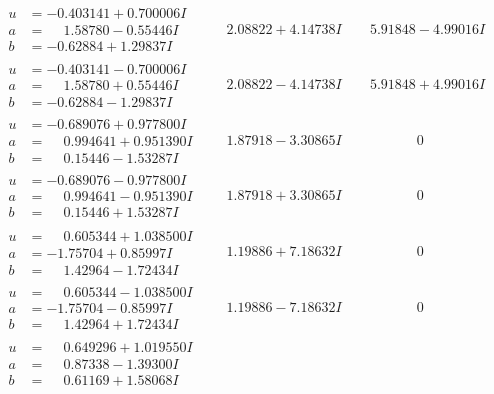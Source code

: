 \documentclass[1p]{elsarticle_modified}
\theoremstyle{definition}
\begin{document}
$$\begin{array}{c|c|c}
\begin{aligned}
u &= -0.403141 + 0.700006 I \\
a &= \phantom{-}1.58780 - 0.55446 I \\
b &= -0.62884 + 1.29837 I\end{aligned}
 & \phantom{-}2.08822 + 4.14738 I & \phantom{-}5.91848 - 4.99016 I \\ \hline\begin{aligned}
u &= -0.403141 - 0.700006 I \\
a &= \phantom{-}1.58780 + 0.55446 I \\
b &= -0.62884 - 1.29837 I\end{aligned}
 & \phantom{-}2.08822 - 4.14738 I & \phantom{-}5.91848 + 4.99016 I \\ \hline\begin{aligned}
u &= -0.689076 + 0.977800 I \\
a &= \phantom{-}0.994641 + 0.951390 I \\
b &= \phantom{-}0.15446 - 1.53287 I\end{aligned}
 & \phantom{-}1.87918 - 3.30865 I & \phantom{-0.000000 } 0 \\ \hline\begin{aligned}
u &= -0.689076 - 0.977800 I \\
a &= \phantom{-}0.994641 - 0.951390 I \\
b &= \phantom{-}0.15446 + 1.53287 I\end{aligned}
 & \phantom{-}1.87918 + 3.30865 I & \phantom{-0.000000 } 0 \\ \hline\begin{aligned}
u &= \phantom{-}0.605344 + 1.038500 I \\
a &= -1.75704 + 0.85997 I \\
b &= \phantom{-}1.42964 - 1.72434 I\end{aligned}
 & \phantom{-}1.19886 + 7.18632 I & \phantom{-0.000000 } 0 \\ \hline\begin{aligned}
u &= \phantom{-}0.605344 - 1.038500 I \\
a &= -1.75704 - 0.85997 I \\
b &= \phantom{-}1.42964 + 1.72434 I\end{aligned}
 & \phantom{-}1.19886 - 7.18632 I & \phantom{-0.000000 } 0 \\ \hline\begin{aligned}
u &= \phantom{-}0.649296 + 1.019550 I \\
a &= \phantom{-}0.87338 - 1.39300 I \\
b &= \phantom{-}0.61169 + 1.58068 I\end{aligned}

\end{array}$$
\end{document}
